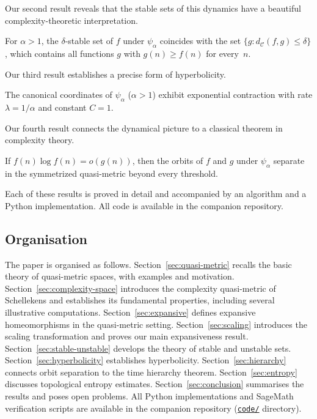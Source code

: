 \documentclass[11pt,a4paper]{article}
\newcommand{\repourl}{https://github.com/guydev42/expansive-homeomorphisms-complexity-qmetric}
\theoremstyle{plain}
\theoremstyle{definition}
\newcommand{\C}{\mathcal{C}}
\begin{document}
Our second result reveals that the stable sets of this dynamics have a
beautiful complexity-theoretic interpretation.

\begin{keyresult}
For $\alpha>1$, the $\delta$-stable set of $f$ under $\psi_\alpha$
coincides with the set $\{g: d_\C(f,g)\le\delta\}$, which contains
all functions $g$ with $g(n)\ge f(n)$ for every~$n$.
\end{keyresult}

Our third result establishes a precise form of hyperbolicity.

\begin{keyresult}
The canonical coordinates of $\psi_\alpha$ ($\alpha>1$) exhibit
exponential contraction with rate $\lambda=1/\alpha$ and constant $C=1$.
\end{keyresult}

Our fourth result connects the dynamical picture to a classical theorem
in complexity theory.

\begin{keyresult}
If $f(n)\log f(n)=o(g(n))$, then the orbits of $f$ and $g$ under
$\psi_\alpha$ separate in the symmetrized quasi-metric beyond every
threshold.
\end{keyresult}

Each of these results is proved in detail and accompanied by an
algorithm and a Python implementation.  All code is available in
the companion repository.

\subsection{Organisation}

The paper is organised as follows.  Section~\ref{sec:quasi-metric}
recalls the basic theory of quasi-metric spaces, with examples and
motivation.  Section~\ref{sec:complexity-space} introduces the
complexity quasi-metric of Schellekens and establishes its
fundamental properties, including several illustrative computations.
Section~\ref{sec:expansive} defines expansive homeomorphisms in the
quasi-metric setting.  Section~\ref{sec:scaling} introduces the
scaling transformation and proves our main expansiveness result.
Section~\ref{sec:stable-unstable} develops the theory of stable and
unstable sets.  Section~\ref{sec:hyperbolicity} establishes
hyperbolicity.  Section~\ref{sec:hierarchy} connects orbit
separation to the time hierarchy theorem.
Section~\ref{sec:entropy} discusses topological entropy estimates.
Section~\ref{sec:conclusion} summarises the results and poses open
problems.  All Python implementations and SageMath verification
scripts are available in the companion repository
(\href{\repourl/tree/main/code}{\texttt{code/}} directory).
\end{document}
